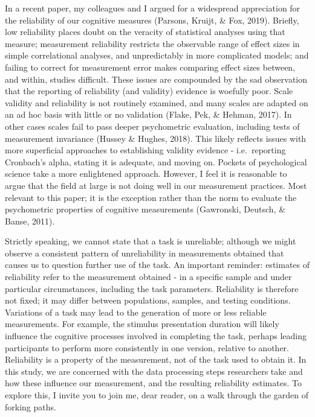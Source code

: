 \documentclass[
  english,
  man,floatsintext]{apa6}
\begin{document}
In a recent paper, my colleagues and I argued for a widespread appreciation for the reliability of our cognitive measures (Parsons, Kruijt, \& Fox, 2019). Briefly, low reliability places doubt on the veracity of statistical analyses using that measure; measurement reliability restricts the observable range of effect sizes in simple correlational analyses, and unpredictably in more complicated models; and failing to correct for measurement error makes comparing effect sizes between, and within, studies difficult. These issues are compounded by the sad observation that the reporting of reliability (and validity) evidence is woefully poor. Scale validity and reliability is not routinely examined, and many scales are adapted on an ad hoc basis with little or no validation (Flake, Pek, \& Hehman, 2017). In other cases scales fail to pass deeper psychometric evaluation, including tests of measurement invariance (Hussey \& Hughes, 2018). This likely reflects issues with more superficial approaches to establishing validity evidence - i.e.~reporting Cronbach's alpha, stating it is adequate, and moving on. Pockets of psychological science take a more enlightened approach. However, I feel it is reasonable to argue that the field at large is not doing well in our measurement practices. Most relevant to this paper; it is the exception rather than the norm to evaluate the psychometric properties of cognitive measurements (Gawronski, Deutsch, \& Banse, 2011).

Strictly speaking, we cannot state that a task is unreliable; although we might observe a consistent pattern of unreliability in measurements obtained that causes us to question further use of the task. An important reminder: estimates of reliability refer to the measurement obtained - in a specific sample and under particular circumstances, including the task parameters. Reliability is therefore not fixed; it may differ between populations, samples, and testing conditions. Variations of a task may lead to the generation of more or less reliable measurements. For example, the stimulus presentation duration will likely influence the cognitive processes involved in completing the task, perhaps leading participants to perform more consistently in one version, relative to another. Reliability is a property of the measurement, not of the task used to obtain it. In this study, we are concerned with the data processing steps researchers take and how these influence our measurement, and the resulting reliability estimates. To explore this, I invite you to join me, dear reader, on a walk through the garden of forking paths.
\end{document}
